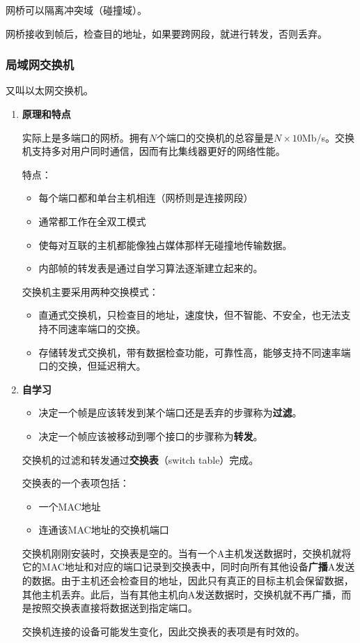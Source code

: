 \documentclass[12pt, a4paper, oneside]{ctexart}
\begin{document}
网桥可以隔离冲突域（碰撞域）。

网桥接收到帧后，检查目的地址，如果要跨网段，就进行转发，否则丢弃。

\subsubsection{局域网交换机}

又叫以太网交换机。

\begin{enumerate}
    \item {\bf 原理和特点}
    
    实际上是多端口的网桥。拥有$N$个端口的交换机的总容量是$N\times 10$Mb/s。交换机支持多对用户同时通信，因而有比集线器更好的网络性能。

    特点：
    \begin{itemize}
        \item 每个端口都和单台主机相连（网桥则是连接网段）
        \item 通常都工作在全双工模式
        \item 使每对互联的主机都能像独占媒体那样无碰撞地传输数据。
        \item 内部帧的转发表是通过自学习算法逐渐建立起来的。
    \end{itemize}

    交换机主要采用两种交换模式：
    \begin{itemize}
        \item 直通式交换机，只检查目的地址，速度快，但不智能、不安全，也无法支持不同速率端口的交换。
        \item 存储转发式交换机，带有数据检查功能，可靠性高，能够支持不同速率端口的交换，但延迟稍大。
    \end{itemize}
    \item {\bf 自学习}
    
    \begin{itemize}
        \item 决定一个帧是应该转发到某个端口还是丢弃的步骤称为\textbf{过滤}。
        \item 决定一个帧应该被移动到哪个接口的步骤称为\textbf{转发}。
    \end{itemize}

    交换机的过滤和转发通过\textbf{交换表}（switch table）完成。

    交换表的一个表项包括：
    \begin{itemize}
        \item 一个MAC地址
        \item 连通该MAC地址的交换机端口
    \end{itemize}

    交换机刚刚安装时，交换表是空的。当有一个A主机发送数据时，交换机就将它的MAC地址和对应的端口记录到交换表中，同时向所有其他设备\textbf{广播}A发送的数据。由于主机还会检查目的地址，因此只有真正的目标主机会保留数据，其他主机丢弃。此后，当有其他主机向A发送数据时，交换机就不再广播，而是按照交换表直接将数据送到指定端口。

    交换机连接的设备可能发生变化，因此交换表的表项是有时效的。
\end{enumerate}
\end{document}
